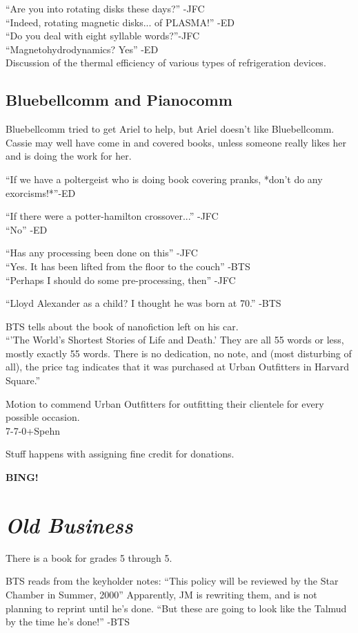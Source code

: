 \documentclass[10pt]{article}
\newcommand{\bing}{{\bf BING!} }
\newcommand{\goto}[1]{\bing \vskip 12pt \section*{{\em{#1}}}}
\begin{document}
``Are you into rotating disks these days?'' -JFC \\
``Indeed, rotating magnetic disks... of PLASMA!'' -ED\\
``Do you deal with eight syllable words?''-JFC\\
``Magnetohydrodynamics? Yes'' -ED \\

Discussion of the thermal efficiency of various types of refrigeration
devices.

\subsection*{Bluebellcomm and Pianocomm}
Bluebellcomm tried to get Ariel to help, but Ariel doesn't like
Bluebellcomm.  Cassie may well have come in and covered books, unless
someone really likes her and is doing the work for her.

``If we have a poltergeist who is doing book covering pranks, *don't
do any exorcisms!*''-ED

``If there were a potter-hamilton crossover...'' -JFC\\
``No'' -ED

``Has any processing been done on this'' -JFC\\
``Yes. It has been lifted from the floor to the couch'' -BTS\\
``Perhaps I should do some pre-processing, then'' -JFC

``Lloyd Alexander as a child?  I thought he was born at 70.'' -BTS

BTS tells about the book of nanofiction left on his car.\\
``'The World's Shortest Stories of Life and Death.'  They are all 55 words
or less, mostly exactly 55 words.  There is no dedication, no note,
and (most disturbing of all), the price tag indicates that it was
purchased at Urban Outfitters in Harvard Square.''

Motion to commend Urban Outfitters for outfitting their clientele for
every possible occasion.\\
7-7-0+Spehn

Stuff happens with assigning fine credit for donations. 

\goto{Old Business}
There is a book for grades 5 through 5.

BTS reads from the keyholder notes: 
``This policy will be reviewed by the Star Chamber in Summer, 2000''
Apparently, JM is rewriting them, and is not planning to reprint until
he's done.   ``But these are going to look like the Talmud by the time he's done!'' -BTS
\end{document}

